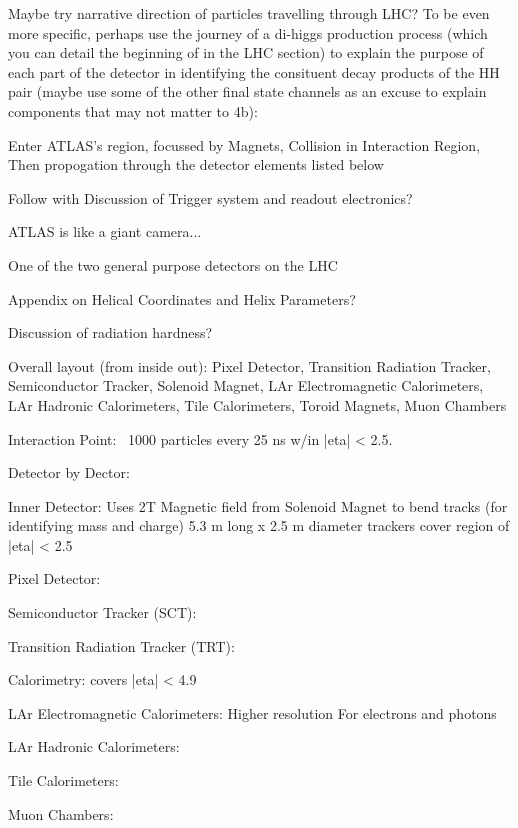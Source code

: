 Maybe try narrative direction of particles travelling through LHC?
To be even more specific, perhaps use the journey of a di-higgs production process
(which you can detail the beginning of in the LHC section)
to explain the purpose of each part of the detector in identifying the consituent decay products of the HH pair
(maybe use some of the other final state channels as an excuse to explain components that may not matter to 4b):

Enter ATLAS's region,
focussed by Magnets,
Collision in Interaction Region,
Then propogation through the detector elements listed below



Follow with Discussion of Trigger system and readout electronics?


ATLAS is like a giant camera...

One of the two general purpose detectors on the LHC

Appendix on Helical Coordinates and Helix Parameters?

Discussion of radiation hardness?

Overall layout (from inside out):
Pixel Detector,
Transition Radiation Tracker,
Semiconductor Tracker,
Solenoid Magnet,
LAr Electromagnetic Calorimeters,
LAr Hadronic Calorimeters,
Tile Calorimeters,
Toroid Magnets,
Muon Chambers




Interaction Point:
~1000 particles every 25 ns w/in |eta| < 2.5.



Detector by Dector:

Inner Detector:
    Uses 2T Magnetic field from Solenoid Magnet to bend tracks (for identifying mass and charge)
    5.3 m long x 2.5 m diameter
    trackers cover region of |eta| < 2.5

    Pixel Detector:

    Semiconductor Tracker (SCT):

    Transition Radiation Tracker (TRT):

Calorimetry:
    covers |eta| < 4.9

LAr Electromagnetic Calorimeters:
    Higher resolution
    For electrons and photons

LAr Hadronic Calorimeters:
    

Tile Calorimeters:

Muon Chambers:



